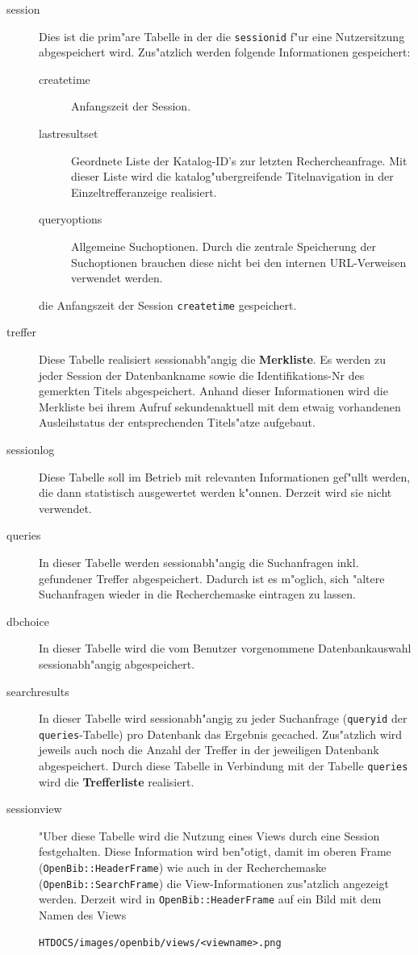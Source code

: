 \documentclass[11pt, twoside, a4paper, BCOR8mm, DIV12, bibtotoc,idxtotoc]{scrbook}
\begin{document}
\begin{description}
\item[session] Dies ist die prim"are Tabelle in der die
  \texttt{sessionid} f"ur eine Nutzersitzung abgespeichert wird.
  Zus"atzlich werden folgende Informationen gespeichert:
  \begin{description}
  \item[createtime] Anfangszeit der Session.
  \item[lastresultset] Geordnete Liste der Katalog-ID's zur letzten
    Rechercheanfrage. Mit dieser Liste wird die katalog"ubergreifende
    Titelnavigation in der Einzeltrefferanzeige realisiert.
  \item[queryoptions] Allgemeine Suchoptionen. Durch die zentrale Speicherung der
    Suchoptionen brauchen diese nicht bei den internen URL-Verweisen
    verwendet werden.
  \end{description}
die Anfangszeit der Session \texttt{createtime}
  gespeichert. 
\item[treffer] Diese Tabelle realisiert sessionabh"angig die
  \textbf{Merkliste}. Es werden zu jeder Session der Datenbankname sowie die
  Identifikations-Nr des gemerkten Titels abgespeichert. Anhand dieser
  Informationen wird die Merkliste bei ihrem Aufruf sekundenaktuell
  mit dem etwaig vorhandenen Ausleihstatus der entsprechenden
  Titels"atze aufgebaut.
\item[sessionlog] Diese Tabelle soll im Betrieb mit relevanten
  Informationen gef"ullt werden, die dann statistisch ausgewertet
  werden k"onnen. Derzeit wird sie nicht verwendet.
\item[queries] In dieser Tabelle werden sessionabh"angig die
  Suchanfragen inkl. gefundener Treffer ab\-ge\-spei\-chert. Dadurch ist es
  m"oglich, sich "altere Suchanfragen wieder in die Recherchemaske
  eintragen zu lassen.
\item[dbchoice] In dieser Tabelle wird die vom Benutzer vorgenommene
  Datenbankauswahl session\-ab\-h"angig abgespeichert.
\item[searchresults] In dieser Tabelle wird session\-ab\-h"an\-gig zu jeder
  Suchanfrage (\texttt{queryid} der \texttt{queries}-Tabelle) pro
  Datenbank das Ergebnis gecached. Zus"atzlich wird jeweils auch noch
  die Anzahl der Treffer in der jeweiligen Datenbank
  ab\-ge\-spei\-chert. Durch diese Tabelle in Verbindung mit der Tabelle
  \texttt{queries} wird die \textbf{Trefferliste} realisiert.
\item[sessionview] "Uber diese Tabelle wird die Nutzung eines Views
  durch eine Session festgehalten. Diese Information wird ben"otigt,
  damit im oberen Frame (\texttt{OpenBib::HeaderFrame}) wie auch in der
  Recherchemaske (\texttt{OpenBib::SearchFrame}) die View-Informationen
  zus"atzlich angezeigt werden. Derzeit wird in \texttt{OpenBib::HeaderFrame}
  auf ein Bild mit dem Namen des Views
\begin{verbatim}
HTDOCS/images/openbib/views/<viewname>.png
\end{verbatim}


\end{description}
\end{document}
